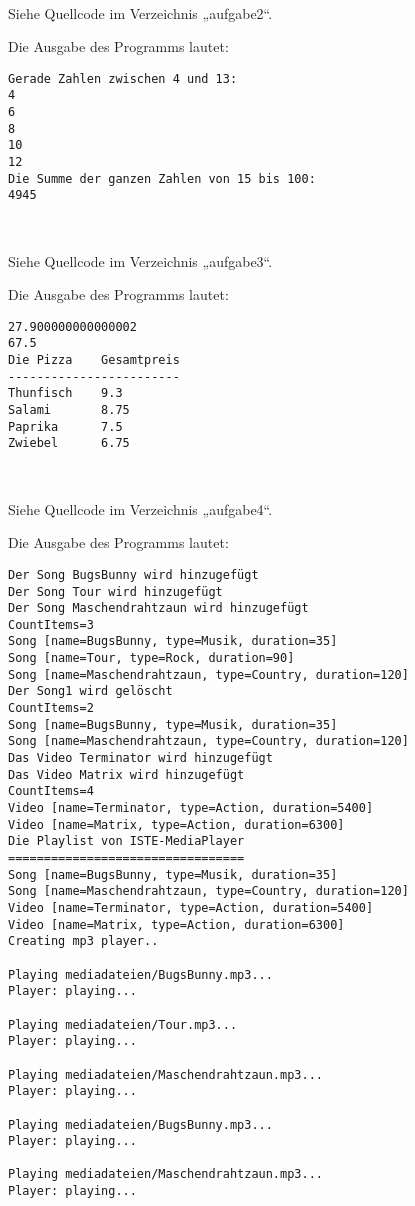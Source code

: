 \documentclass[a4paper]{scrartcl}
\begin{document}
\setcounter{aufgabe}{1}

\begin{aufgabe}~

	Siehe Quellcode im Verzeichnis „aufgabe2“.

	Die Ausgabe des Programms lautet:
	\begin{verbatim}
Gerade Zahlen zwischen 4 und 13:
4
6
8
10
12
Die Summe der ganzen Zahlen von 15 bis 100:
4945
	\end{verbatim}
\end{aufgabe}

\begin{aufgabe}~

	Siehe Quellcode im Verzeichnis „aufgabe3“.

	Die Ausgabe des Programms lautet:
	\begin{verbatim}
27.900000000000002
67.5
Die Pizza    Gesamtpreis
------------------------
Thunfisch    9.3
Salami       8.75
Paprika      7.5
Zwiebel      6.75

	\end{verbatim}
\end{aufgabe}

\begin{aufgabe}~

	Siehe Quellcode im Verzeichnis „aufgabe4“.

	Die Ausgabe des Programms lautet:
	\begin{verbatim}
Der Song BugsBunny wird hinzugefügt
Der Song Tour wird hinzugefügt
Der Song Maschendrahtzaun wird hinzugefügt
CountItems=3
Song [name=BugsBunny, type=Musik, duration=35]
Song [name=Tour, type=Rock, duration=90]
Song [name=Maschendrahtzaun, type=Country, duration=120]
Der Song1 wird gelöscht
CountItems=2
Song [name=BugsBunny, type=Musik, duration=35]
Song [name=Maschendrahtzaun, type=Country, duration=120]
Das Video Terminator wird hinzugefügt
Das Video Matrix wird hinzugefügt
CountItems=4
Video [name=Terminator, type=Action, duration=5400]
Video [name=Matrix, type=Action, duration=6300]
Die Playlist von ISTE-MediaPlayer
=================================
Song [name=BugsBunny, type=Musik, duration=35]
Song [name=Maschendrahtzaun, type=Country, duration=120]
Video [name=Terminator, type=Action, duration=5400]
Video [name=Matrix, type=Action, duration=6300]
Creating mp3 player..

Playing mediadateien/BugsBunny.mp3...
Player: playing...

Playing mediadateien/Tour.mp3...
Player: playing...

Playing mediadateien/Maschendrahtzaun.mp3...
Player: playing...

Playing mediadateien/BugsBunny.mp3...
Player: playing...

Playing mediadateien/Maschendrahtzaun.mp3...
Player: playing...
	\end{verbatim}
\end{aufgabe}
\end{document}
